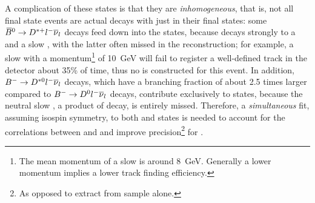 A complication of these states is that they are \emph{inhomogeneous},
that is, not all \Dz\mun final state events are actual decays with just \Dz\mun
in their final states:
some ${{\kern 0.18em\overline{\kern -0.18em B}}{}^0} \rightarrow {\ensuremath{{D}^{*+}}}{\ensuremath{l^-}}{\ensuremath{{\overline{\nu}}_l}}$ decays feed down into the \Dz\mun
states,
because \Dstarp decays strongly to a \Dz and a slow \pip,
with the latter often missed in the reconstruction;
for example, a slow \pip with a momentum\footnote{
    The mean momentum of a slow \pip is around 8~GeV.
    Generally a lower momentum implies a lower track finding efficiency.
} of 10~GeV will fail to register a
well-defined track in the detector about 35\% of time,
thus no \Dstarp is constructed for this event.
In addition, ${{{B}^-}} \rightarrow {\ensuremath{{D}^{*0}}}{\ensuremath{l^-}}{\ensuremath{{\overline{\nu}}_l}}$ decays,
which have a branching fraction of about 2.5 times larger compared to
${{{B}^-}} \rightarrow {\ensuremath{{D}^0}}{\ensuremath{l^-}}{\ensuremath{{\overline{\nu}}_l}}$ decays,
contribute exclusively to \Dz\mun states, because the neutral slow
\piz, a product of \Dstarz decay, is entirely missed.
Therefore, a \emph{simultaneous} fit,
assuming isospin symmetry,
to both \Dstarp\mun and \Dz\mun states is needed to
account for the correlations between \RD and \RDst and improve
precision\footnote{
    As opposed to extract \RDst from \Dstarp\mun sample alone.
} for \RDst.

